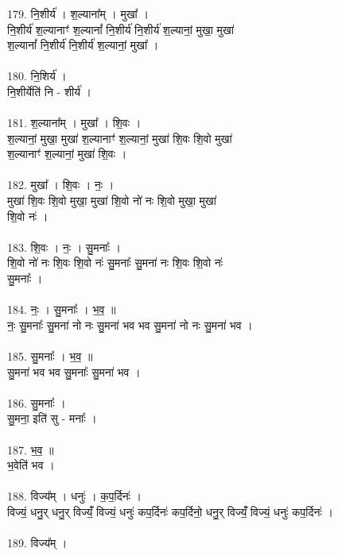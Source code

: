 \subsubsection{}
179. नि॒शीर्य॑ । श॒ल्याना᳚म् । मुखा᳚ ।\\
नि॒शीर्य॑ श॒ल्यानाꣳ॑ श॒ल्यानां᳚ नि॒शीर्य॑ नि॒शीर्य॑ श॒ल्यानां॒ मुखा॒ मुखा॑\\
श॒ल्यानां᳚ नि॒शीर्य॑ नि॒शीर्य॑ श॒ल्यानां॒ मुखा᳚ ।\\
\\
180. नि॒शिर्य॑ ।\\
नि॒शीर्येति॑ नि - शीर्य॑ ।\\
\\
181. श॒ल्याना᳚म् । मुखा᳚ । शि॒वः ।\\
श॒ल्यानां॒ मुखा॒ मुखा॑ श॒ल्यानाꣳ॑ श॒ल्यानां॒ मुखा॑ शि॒वः शि॒वो मुखा॑\\
श॒ल्यानाꣳ॑ श॒ल्यानां॒ मुखा॑ शि॒वः ।\\
\\
182. मुखा᳚ । शि॒वः । नः॒ ।\\
मुखा॑ शि॒वः शि॒वो मुखा॒ मुखा॑ शि॒वो नो॑ नः शि॒वो मुखा॒ मुखा॑\\
शि॒वो नः॑ ।\\
\\
183. शि॒वः । नः॒ । सु॒मनाः᳚ ।\\
शि॒वो नो॑ नः शि॒वः शि॒वो नः॑ सु॒मनाः᳚ सु॒मना॑ नः शि॒वः शि॒वो नः॑\\
सु॒मनाः᳚ ।\\
\\
184. नः॒ । सु॒मनाः᳚ । भ॒व॒ ॥\\
नः॒ सु॒मनाः᳚ सु॒मना॑ नो नः सु॒मना॑ भव भव सु॒मना॑ नो नः सु॒मना॑ भव ।\\
\\
185. सु॒मनाः᳚ । भ॒व॒ ॥\\
सु॒मना॑ भव भव सु॒मनाः᳚ सु॒मना॑ भव ।\\
\\
186. सु॒मनाः᳚ ।\\
सु॒मना॒ इति॑ सु - मनाः᳚ ।\\
\\
187. भ॒व॒ ॥\\
भ॒वेति॑ भव ।\\
\\
188. विज्य᳚म् । धनुः॑ । क॒प॒र्दिनः॑ ।\\
विज्यं॒ धनु॒र् धनु॒र् विज्यंँ॒ विज्यं॒ धनुः॑ कप॒र्दिनः॑ कप॒र्दिनो॒ धनु॒र् विज्यंँ॒ विज्यं॒ धनुः॑ कप॒र्दिनः॑ ।\\
\\
189. विज्य᳚म् ।\\
